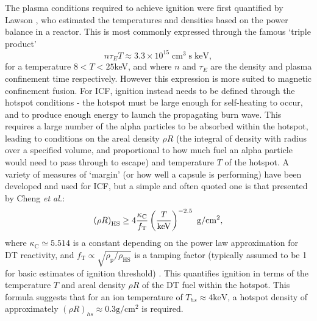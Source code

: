 The plasma conditions required to achieve ignition were first quantified by Lawson \cite{Lawson1957}, who estimated the temperatures and densities based on the power balance in a reactor. This is most commonly expressed through the famous `triple product' 
\begin{equation} n \tau_E T \approx 3.3 \times 10^{15} \; \unit{\centi\meter\cubed} \; \unit{\second}\; \text{keV}, \end{equation}
for a temperature $8 < T < 25 $keV, and where $n$ and $\tau_E$ are the density and plasma confinement time respectively. However this expression is more suited to magnetic confinement fusion. For ICF, ignition instead needs to be defined through the hotspot conditions - the hotspot must be large enough for self-heating to occur, and to produce enough energy to launch the propagating burn wave. This requires a large number of the alpha particles to be absorbed within the hotspot, leading to conditions on the areal density $\rho R$ (the integral of density with radius over a specified volume, and proportional to how much fuel an alpha particle would need to pass through to escape) and temperature $T$ of the hotspot. A variety of measures of `margin' (or how well a capsule is performing) have been developed and used for ICF, but a simple and often quoted one is that presented by Cheng \textit{et al.}:
\begin{equation} \left( \rho R \right)_\mathrm{HS} \geq 4 \frac{\kappa_\mathrm{C}}{f_\mathrm{T}} \left( \frac{T}{\mathrm{keV}} \right)^{-2.5} \text{ \si[per-mode=symbol]{\gram\per\centi\meter\squared}}, \label{ChengEqn} \end{equation}
where $\kappa_\mathrm{C} \simeq 5.514$ is a constant depending on the power law approximation for DT reactivity, and $f_\mathrm{T} \propto \sqrt{ \rho_\mathrm{p} / \rho_\mathrm{HS}}$ is a tamping factor (typically assumed to be 1 for basic estimates of ignition threshold) \cite{Cheng2014}. This quantifies ignition in terms of the temperature $T$ and areal density $\rho R$ of the DT fuel within the hotspot. This formula suggests that for an ion temperature of $T_{hs} \approx 4 \text{keV}$, a hotspot density of approximately $(\rho R)_{hs} \approx 0.3 \unit{\gram\per\centi\meter\squared}$ is required.

